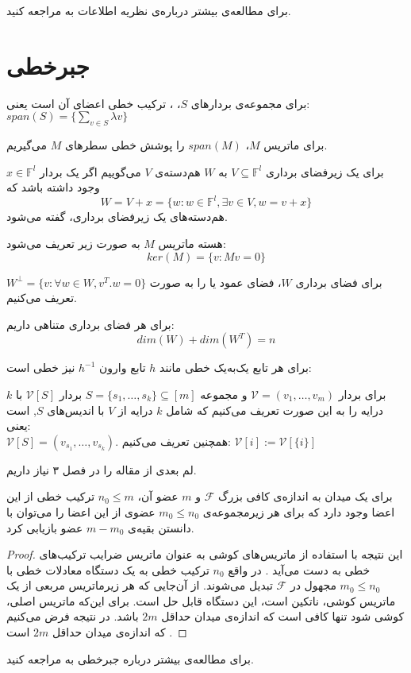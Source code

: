 	برای مطالعه‌ی بیشتر درباره‌ی نظریه اطلاعات به
\cite{book:info}
مراجعه کنید.
\section{جبرخطی}
\begin{definition}
	برای مجموعه‌ی بردار‌های
	$S$، ،
	ترکیب خطی اعضای آن است یعنی:
	$span(S) = \{ \sum\limits_{v \in S} \lambda v\}$
	
	برای ماتریس
	$M$، $span(M)$
را پوشش خطی سطرهای 
$M$
می‌گیریم.
\end{definition}

\begin{definition}[هم‌دسته]
	\label{coset}
	برای یک زیرفضای برداری
	$V \subseteq \mathbb{F}^l$
	به
	$W$
	هم‌دسته‌‌‌ی
	$V$
	می‌گوییم اگر یک بردار
	$x \in \mathbb{F}^l$
	وجود داشته باشد که
	$$W = V + x = \{w: w \in \mathbb{F}^l, \exists v \in V, w = v + x\}$$
	هم‌دسته‌های یک زیرفضای برداری،
	گفته می‌شود.
\end{definition}
\begin{definition}
	هسته ماتریس
	$M$
	به صورت زیر تعریف می‌شود:
	$$ker(M) = \{v: Mv = 0\}$$
\end{definition}
برای فضای برداری
$W$،
فضای عمود یا 
 را به صورت
$W^\bot = \{v: \forall w \in W, v^T.w = 0\}$
تعریف می‌کنیم.

\begin{theorem}
	برای هر فضای برداری متناهی داریم:
	$$dim(W) + dim(W^T) = n$$
\end{theorem}
\begin{remark}
	برای هر تابع یک‌به‌یک خطی مانند
	$h$
	تابع وارون 
	$h^{-1}$
	نیز خطی است:
\end{remark}

برای بردار
$\mathcal{V} = (v_1, \ldots, v_m)$ 
و مجموعه
$S = \{s_1, \ldots, s_k\} \subseteq [m]$
بردار
$\mathcal{V} [S]$ 
با 
$k$ درایه 
را به این صورت تعریف می‌کنیم که شامل
$k$ 
درایه از
$V$ 
با اندیس‌های
$S$, 
است یعنی:\\
$\mathcal{V} [S] = (v_{s_1}, \ldots, v_{s_k})$.
همچنین تعریف می‌کنیم:
$\mathcal{V} [i] := \mathcal{V} [{\{i\}}]$

لم بعدی از مقاله
\cite{pliable2015paper}
را در فصل ۳ نیاز داریم.
\begin{lemma}
	\label{lemma:pliable20151}
	برای یک میدان به اندازه‌ی کافی بزرگ
	$\mathcal{F}$
	و
	$m$
	عضو آن،
	$n_0 \leq m$
	ترکیب خطی از این اعضا وجود دارد که برای هر زیرمجموعه‌ی
	$m_0 \leq n_0$
	عضوی از این اعضا را می‌توان با دانستن بقیه‌ی
	$m - m_0$
	عضو بازیابی کرد.
\end{lemma}
\begin{proof}
این نتیجه با استفاده از ماتریس‌های کوشی به عنوان ماتریس ضرایب ترکیب‌های خطی به دست می‌آید
\cite{Blmer1995AnXE}.
در واقع
$n_0$
ترکیب خطی به یک دستگاه معادلات خطی با
$m_0 \leq n_0$
مجهول در
$\mathcal{F}$
تبدیل می‌شوند. از آن‌جایی که هر زیرماتریس مربعی از یک ماتریس کوشی، ناتکین است، این دستگاه قابل حل است. برای این‌که ماتریس اصلی، کوشی شود تنها کافی است که اندازه‌ی میدان حداقل
$2m$
باشد. در نتیجه فرض می‌کنیم که اندازه‌ی میدان حداقل
$2m$
است
\cite{pliable2015paper}.
\end{proof}
	برای مطالعه‌ی بیشتر درباره جبرخطی به
\cite{sheldon}
مراجعه کنید.

